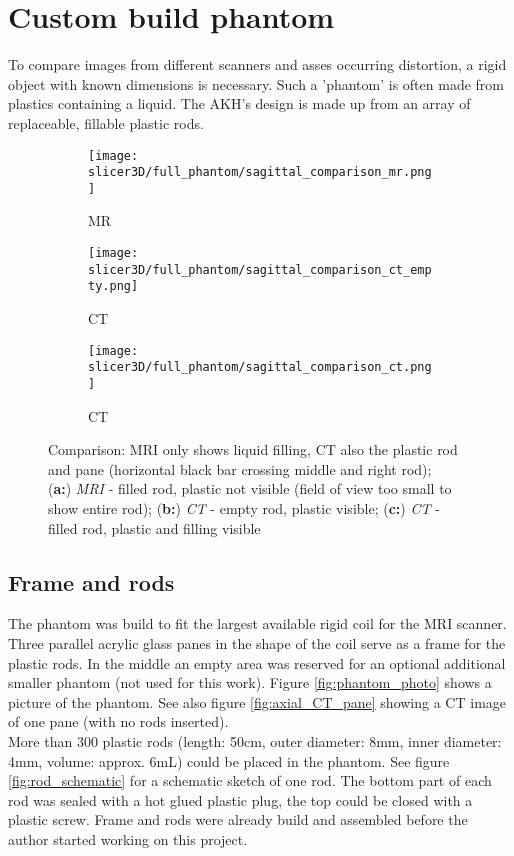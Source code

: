 \section{Custom build phantom}

To compare images from different scanners and asses occurring distortion, a rigid object with known dimensions is necessary.
Such a 'phantom' is often made from plastics containing a liquid.
The AKH's design is made up from an array of replaceable, fillable plastic rods.

\begin{figure}[!htb]
\centering
  \begin{subfigure}[b]{0.1\textwidth}
    \texttt{[image: slicer3D/full\_phantom/sagittal\_comparison\_mr.png]}
    \caption{MR}
    \label{fig:sagittal_comparison_mr}
  \end{subfigure}
  \begin{subfigure}[b]{0.1\textwidth}
    \texttt{[image: slicer3D/full\_phantom/sagittal\_comparison\_ct\_empty.png]}
    \caption{CT}
    \label{fig:sagittal_comparison_ct_empty}
  \end{subfigure}
  \begin{subfigure}[b]{0.1\textwidth}
    \texttt{[image: slicer3D/full\_phantom/sagittal\_comparison\_ct.png]}
    \caption{CT}
    \label{fig:sagittal_comparison_ct}
  \end{subfigure}
  \caption{Comparison: MRI only shows liquid filling, CT also the plastic rod and pane (horizontal black bar crossing middle and right rod);\\ (\textbf{a:}) \textit{MRI} - filled rod, plastic not visible (field of view too small to show entire rod); (\textbf{b:}) \textit{CT} - empty rod, plastic visible; (\textbf{c:}) \textit{CT} - filled rod, plastic and filling visible}
  \label{fig:sagittal_comparison}
\end{figure}

\subsection{Frame and rods}

The phantom was build to fit the largest available rigid coil for the MRI scanner.
Three parallel acrylic glass panes in the shape of the coil serve as a frame for the plastic rods.
In the middle an empty area was reserved for an optional additional smaller phantom (not used for this work).
Figure \ref{fig:phantom_photo} shows a picture of the phantom. See also figure \ref{fig:axial_CT_pane} showing a CT image of one pane (with no rods inserted). \\
More than 300 plastic rods (length: 50cm, outer diameter: 8mm, inner diameter: 4mm, volume: approx. 6mL) could be placed in the phantom.
See figure \ref{fig:rod_schematic} for a schematic sketch of one rod.
The bottom part of each rod was sealed with a hot glued plastic plug, the top could be closed with a plastic screw.
Frame and rods were already build and assembled before the author started working on this project.


